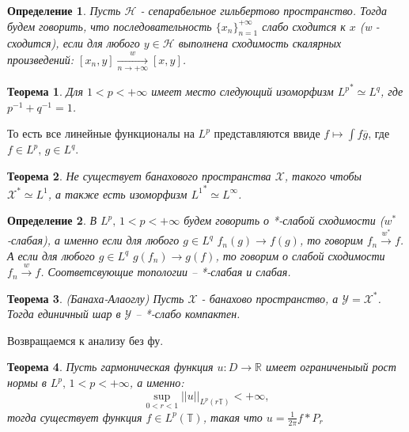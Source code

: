 \documentclass[12pt,a4paper]{article} %
\newtheorem{theorem}{Теорема}
\newtheorem{definition}{Определение}
\newcommand{\R}{\mathbb{R}}
\begin{document}
	\begin{definition}
		Пусть $\mathcal{H}$ - сепарабельное гильбертово пространство. Тогда будем говорить, что последовательность $\{x_n\}_{n=1}^{+\infty}$ слабо сходится к $x$ (w - сходится), если для любого $y\in\mathcal{H}$ выполнена сходимость скалярных произведений: $[x_n,y]\xrightarrow[n\rightarrow+\infty]{w} [x,y]$.
	\end{definition}
	\begin{theorem}
		Для $1<p<+\infty$ имеет место следующий изоморфизм ${L^p}^{*}\simeq L^q$, где $p^{-1}+q^{-1}=1$.
	\end{theorem}
	То есть все линейные функционалы на $L^p$ представляются ввиде $f\mapsto\int f\overline{g}$, где\\ $f\in L^p,\,g\in L^q$.
	\begin{theorem}
		Не существует банахового пространства $\mathcal{X}$, такого чтобы $\mathcal{X}^{*}\simeq L^1$, а также есть изоморфизм ${L^1}^{*}\simeq L^{\infty}$.
	\end{theorem}
	\begin{definition}
		В $L^p,\,1<p<+\infty$ будем говорить о *-слабой сходимости ($w^{*}$-слабая), а именно если для любого $g\in L^q\,\,f_n(g)\rightarrow f(g)$, то говорим $f_n\xrightarrow{w^{*}} f$. А если для любого $g\in L^q\,\,g(f_n)\rightarrow g(f)$, то говорим о слабой сходимости $f_n\xrightarrow{w}f$. Соответсвующие топологии -- *-слабая и слабая.
	\end{definition}
	\begin{theorem}
		(Банаха-Алаоглу) Пусть $\mathcal{X}$ - банахово пространство, а $\mathcal{Y}=\mathcal{X}^{*}$. Тогда единичный шар в $\mathcal{Y}$ -- *-слабо компактен.
	\end{theorem}
	Возвращаемся к анализу без фу.
	\begin{theorem}
		Пусть гармоническая функция $u:D\rightarrow\R$ имеет ограниченыый рост нормы в $L^p,\,1<p<+\infty$, а именно:
		$$\sup\limits_{0<r<1}||u||_{L^p(r\mathbb{T})}<+\infty,$$
		тогда существует функция $f\in L^p(\mathbb{T})$, такая что $u=\frac{1}{2\pi}f*P_r$
	\end{theorem}
\end{document}
